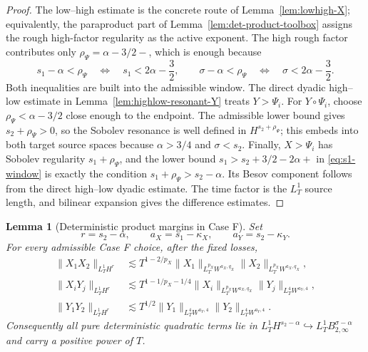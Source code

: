 \documentclass[10pt]{amsart}
\numberwithin{equation}{section}
\theoremstyle{plain}
\newtheorem{lemma}[theorem]{Lemma}
\theoremstyle{definition}
\theoremstyle{remark}
\begin{document}
\begin{proof}
The low--high estimate is the concrete route of Lemma~\ref{lem:lowhigh-X}; equivalently, the paraproduct part of Lemma~\ref{lem:det-product-toolbox} assigns the rough high-factor regularity as the active exponent.  The high rough factor contributes only $\rho_\Psi=\alpha-3/2-$, which is enough because
\[
        s_1-\alpha<\rho_\Psi
        \quad\Longleftrightarrow\quad s_1<2\alpha-\frac32,
        \qquad
        \sigma-\alpha<\rho_\Psi
        \quad\Longleftrightarrow\quad \sigma<2\alpha-\frac32.
\]
Both inequalities are built into the admissible window.  The direct dyadic high--low estimate in Lemma~\ref{lem:highlow-resonant-Y} treats $Y>\Psi_i$.  For $Y\circ\Psi_i$, choose $\rho_\Psi<\alpha-3/2$ close enough to the endpoint.  The admissible lower bound gives $s_2+\rho_\Psi>0$, so the Sobolev resonance is well defined in $H^{s_2+\rho_\Psi}$; this embeds into both target source spaces because $\alpha>3/4$ and $\sigma<s_2$.  Finally, $X>\Psi_i$ has Sobolev regularity $s_1+\rho_\Psi$, and the lower bound $s_1>s_2+3/2-2\alpha+$ in \eqref{eq:s1-window} is exactly the condition $s_1+\rho_\Psi>s_2-\alpha$.  Its Besov component follows from the direct high--low dyadic estimate.  The time factor is the $L_T^1$ source length, and bilinear expansion gives the difference estimates.
\end{proof}



\begin{lemma}[Deterministic product margins in Case F]\label{lem:caseF-product-margins}
Set
\[
        r=s_2-\alpha,
        \qquad a_X=s_1-\kappa_X,
        \qquad a_Y=s_2-\kappa_Y.
\]
For every admissible Case F choice, after the fixed losses,
\begin{align}
\|X_1X_2\|_{L_T^1H^{r}}
&\lesssim
T^{1-2/p_X}
\|X_1\|_{L_T^{p_X}W^{a_X,q_X}}
\|X_2\|_{L_T^{p_X}W^{a_X,q_X}},\label{eq:caseF-XX-margin}\\
\|X_iY_j\|_{L_T^1H^{r}}
&\lesssim
T^{1-1/p_X-1/4}
\|X_i\|_{L_T^{p_X}W^{a_X,q_X}}
\|Y_j\|_{L_T^4W^{a_Y,4}},\label{eq:caseF-XY-margin}\\
\|Y_1Y_2\|_{L_T^1H^{r}}
&\lesssim
T^{1/2}
\|Y_1\|_{L_T^4W^{a_Y,4}}
\|Y_2\|_{L_T^4W^{a_Y,4}}.\label{eq:caseF-YY-margin}
\end{align}
Consequently all pure deterministic quadratic terms lie in
$L_T^1H^{s_2-\alpha}\hookrightarrow L_T^1B_{2,\infty}^{\sigma-\alpha}$ and carry a positive power of $T$.
\end{lemma}
\end{document}
